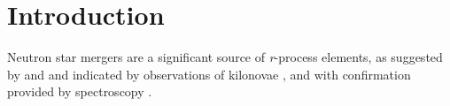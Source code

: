 \documentclass{aa}
\newcommand{\rproc}{\textit{r}-process\xspace}
\begin{document}

\maketitle

\section{Introduction}
Neutron star mergers are a significant source of \rproc elements, as suggested by \cite{Lattimer1977} and \cite{Symbalisty1982} and indicated by observations of kilonovae \citep[e.g.][]{Tanvir2013,Coulter2017}, and with confirmation provided by spectroscopy \citep{Watson2019}. %
\end{document}

